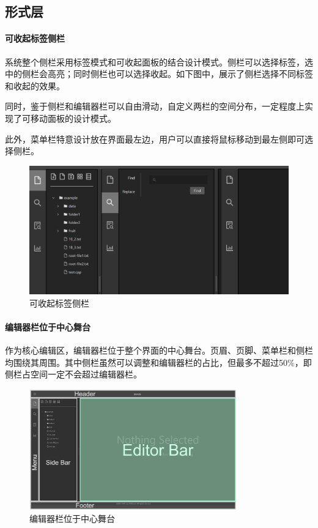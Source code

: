 \documentclass[scheme = chinese]{ctexart}
\begin{document}
\subsection{形式层}

\paragraph{可收起标签侧栏}
系统整个侧栏采用标签模式和可收起面板的结合设计模式。侧栏可以选择标签，选中的侧栏会高亮；同时侧栏也可以选择收起。如下图中，展示了侧栏选择不同标签和收起的效果。

同时，鉴于侧栏和编辑器栏可以自由滑动，自定义两栏的空间分布，一定程度上实现了可移动面板的设计模式。

此外，菜单栏特意设计放在界面最左边，用户可以直接将鼠标移动到最左侧即可选择侧栏。

\begin{figure}[h]
    \centering
    \includegraphics[width=\textwidth]{images/形式-可收起侧栏.png}
    \caption{可收起标签侧栏}
\end{figure}

\clearpage

\paragraph{编辑器栏位于中心舞台}
作为核心编辑区，编辑器栏位于整个界面的中心舞台。页眉、页脚、菜单栏和侧栏均围绕其周围。其中侧栏虽然可以调整和编辑器栏的占比，但最多不超过50\%，即侧栏占空间一定不会超过编辑器栏。

\begin{figure}[h]
    \centering
    \includegraphics[width=0.8\textwidth]{images/dsacd-screenshot-center.drawio.png}
    \caption{编辑器栏位于中心舞台}
\end{figure}
\end{document}
